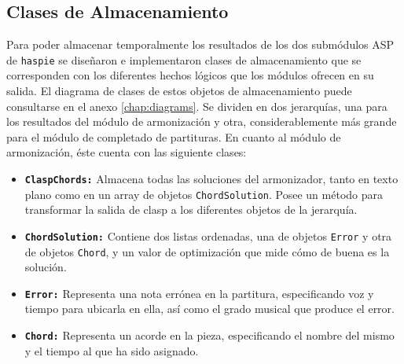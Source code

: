 \subsection{Clases de Almacenamiento}
\label{subsec:store_classes}
Para poder almacenar temporalmente los resultados de los dos submódulos ASP de \texttt{haspie} se diseñaron e implementaron clases de almacenamiento que se corresponden con los diferentes hechos lógicos que los módulos ofrecen en su salida. El diagrama de clases de estos objetos de almacenamiento puede consultarse en el anexo \ref{chap:diagrams}. Se dividen en dos jerarquías, una para los resultados del módulo de armonización y otra, considerablemente más grande para el módulo de completado de partituras. 
En cuanto al módulo de armonización, éste cuenta con las siguiente clases:
\begin{itemize}
	\item \texttt{\textbf{ClaspChords:}} Almacena todas las soluciones del armonizador, tanto en texto plano como en un array de objetos \texttt{ChordSolution}. Posee un método para transformar la salida de clasp a los diferentes objetos de la jerarquía.
	\item \texttt{\textbf{ChordSolution:}} Contiene dos listas ordenadas, una de objetos \texttt{Error} y otra de objetos \texttt{Chord}, y un valor de optimización que mide cómo de buena es la solución.
	\item \texttt{\textbf{Error:}} Representa una nota errónea en la partitura, especificando voz y tiempo para ubicarla en ella, así como el grado musical que produce el error.
	\item \texttt{\textbf{Chord:}} Representa un acorde en la pieza, especificando el nombre del mismo y el tiempo al que ha sido asignado.
\end{itemize}


